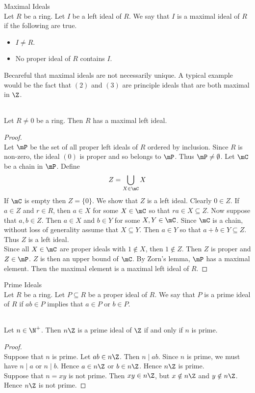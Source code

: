 \documentclass[a4paper]{article}
\begin{document}
\begin{defn}{Maximal Ideals}{}\\
Let $R$ be a ring. Let $I$ be a left ideal of $R$. We say that $I$ is a maximal ideal of $R$ if the following are true. 
\begin{itemize}
\item $I\neq R$. 
\item No proper ideal of $R$ contains $I$. 
\end{itemize}
\end{defn}

Becareful that maximal ideals are not necessarily unique. A typical example would be the fact that $(2)$ and $(3)$ are principle ideals that are both maximal in $\Z$. 

\begin{prp}{}{}\\
Let $R\neq 0$ be a ring. Then $R$ has a maximal left ideal. 
\begin{proof}\\
Let $\mP$ be the set of all proper left ideals of $R$ ordered by inclusion. Since $R$ is non-zero, the ideal $(0)$ is proper and so belongs to $\mP$. Thus $\mP\neq\emptyset$. Let $\mC$ be a chain in $\mP$. Define $$Z=\bigcup_{X\in\mC}X$$ If $\mC$ is empty then $Z=\{0\}$. We show that $Z$ is a left ideal. Clearly $0\in Z$. If $a\in Z$ and $r\in R$, then $a\in X$ for some $X\in\mC$ so that $ra\in X\subseteq Z$. Now suppose that $a,b\in Z$. Then $a\in X$ and $b\in Y$ for some $X,Y\in\mC$. Since $\mC$ is a chain, without loss of generality assume that $X\subseteq Y$. Then $a\in Y$ so that $a+b\in Y\subseteq Z$. Thus $Z$ is a left ideal. \\

Since all $X\in\mC$ are proper ideals with $1\notin X$, then $1\notin Z$. Then $Z$ is proper and $Z\in\mP$. $Z$ is then an upper bound of $\mC$. By Zorn's lemma, $\mP$ has a maximal element. Then the maximal element is a maximal left ideal of $R$. 
\end{proof}
\end{prp}

\begin{defn}{Prime Ideals}{}\\
Let $R$ be a ring. Let $P\subseteq R$ be a proper ideal of $R$. We say that $P$ is a prime ideal of $R$ if $ab\in P$ implies that $a\in P$ or $b\in P$. 
\end{defn}

\begin{eg}{}{}\\
Let $n\in\N^+$. Then $n\Z$ is a prime ideal of $\Z$ if and only if $n$ is prime. 
\begin{proof}\\
Suppose that $n$ is prime. Let $ab\in n\Z$. Then $n\;|\;ab$. Since $n$ is prime, we must have $n\;|\;a$ or $n\;|\;b$. Hence $a\in n\Z$ or $b\in n\Z$. Hence $n\Z$ is prime. \\

Suppose that $n=xy$ is not prime. Then $xy\in n\Z$, but $x\notin n\Z$ and $y\notin n\Z$. Hence $n\Z$ is not prime. 
\end{proof}
\end{eg}
\end{document}
